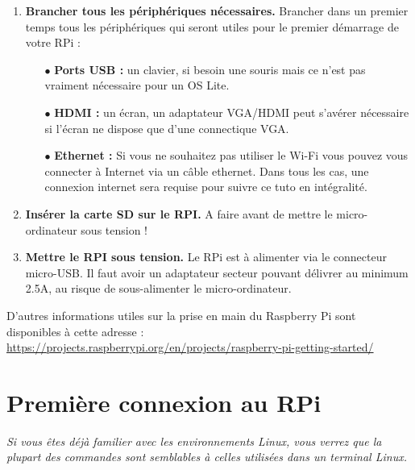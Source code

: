 \documentclass[a4paper, 10pt]{article}
\begin{document}
\begin{enumerate}
	\item\textbf{Brancher tous les périphériques nécessaires.} Brancher dans
	un premier temps tous les périphériques qui seront utiles pour le
	premier démarrage de votre RPi :
	
	\begin{itemize}
		\vspace{0.5em}
		\item[$\bullet$] \textbf{Ports USB :} un clavier, si besoin une souris
		mais ce n'est pas vraiment nécessaire pour un OS Lite.
		\vspace{0.5em}
		\item[$\bullet$] \textbf{HDMI :} un écran, un adaptateur VGA/HDMI peut
		s'avérer nécessaire si l'écran ne dispose que d'une connectique VGA.
		\vspace{0.5em}
		\item[$\bullet$] \textbf{Ethernet :} Si vous ne souhaitez pas utiliser
		le Wi-Fi vous pouvez vous connecter à Internet via un câble ethernet.
		Dans tous les cas, une connexion internet sera requise pour suivre ce
		tuto en intégralité.
		\vspace{0.5em}
	\end{itemize}
	
	\item\textbf{Insérer la carte SD sur le RPI.} A faire avant de mettre le
	micro-ordinateur sous tension !
	
	\item\textbf{Mettre le RPI sous tension.} Le RPi est à alimenter via le
	connecteur micro-USB. Il faut avoir un adaptateur secteur pouvant délivrer
	au minimum 2.5A, au risque de sous-alimenter le micro-ordinateur.
\end{enumerate}

D'autres informations utiles sur la prise en main du Raspberry Pi sont 
disponibles à cette adresse :
\url{https://projects.raspberrypi.org/en/projects/raspberry-pi-getting-started/}

\vspace{-1em}

\section{Première connexion au RPi}

\vspace{-0.5em}

\textit{Si vous êtes déjà familier avec les environnements Linux, vous 
verrez que la plupart des commandes sont semblables à celles utilisées 
dans un terminal Linux.}
\end{document}
